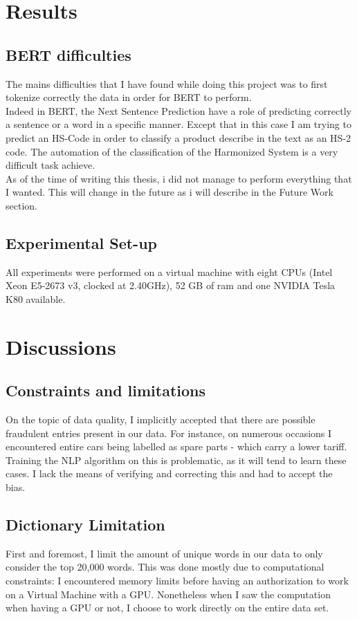 \chapter{Results}
\section{BERT difficulties}

The mains difficulties that I have found while doing this project was to first tokenize correctly the data in order for BERT to perform. \\
Indeed in BERT, the Next Sentence Prediction have a role of predicting correctly a sentence or a word in a specific manner. Except that in this case I am trying to predict an HS-Code in order to classify a product describe in the text as an HS-2 code. The automation of the classification of the Harmonized System is a very difficult task achieve.\\

As of the time of writing this thesis, i did not manage to perform everything that I wanted. This will change in the future as i will describe in the Future Work section.

\section{Experimental Set-up}
All experiments were performed on a virtual machine with eight CPUs (Intel Xeon E5-2673 v3, clocked at 2.40GHz), 52 GB of ram and one NVIDIA Tesla K80 available. 


\chapter{Discussions}
\section{Constraints and limitations}
On the topic of data quality, I implicitly accepted that there are possible fraudulent entries present in our data. For instance, on numerous occasions I encountered entire cars being labelled as spare parts - which carry a lower tariff. Training the NLP algorithm on this is problematic, as it will tend to learn these cases. I lack the means of verifying and correcting this and had to accept the bias.

\section{Dictionary Limitation}
First and foremost, I limit the amount of unique words in our data to only consider the top 20,000 words. This was done mostly due to computational constraints: I encountered memory limits before having an authorization to work on a Virtual Machine with a GPU. Nonetheless when I saw the computation when having a GPU or not, I choose to work directly on the entire data set.